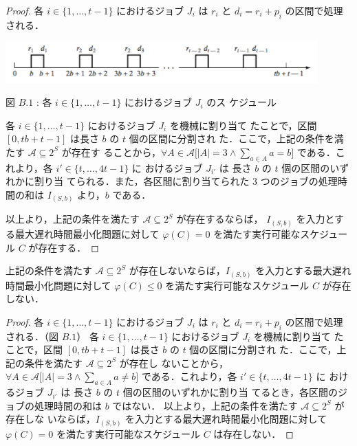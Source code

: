 \documentclass[12pt]{optlab-bachelor}
\begin{document}
\begin{proof}
  各 $i \in \{1,\ldots,t - 1\}$ におけるジョブ $J_i$ は $r_i$ と $d_i =
  r_i + p_i$ の区間で処理される．
  \begin{center}
    \includegraphics[width = 12cm]{Lmax1.png}

    図 $B.1$ : 各 $i \in \{1,\ldots,t - 1\}$ におけるジョブ $J_i$ のス
    ケジュール
  \end{center}
  各 $i \in \{1,\ldots,t - 1\}$ におけるジョブ $J_i$ を機械に割り当て
  たことで，区間 $[0,tb + t - 1]$ は長さ $b$ の $t$ 個の区間に分割され
  た．ここで，上記の条件を満たす $\mathcal{A} \subseteq 2^S$ が存在す
  ることから，$\forall A \in \mathcal{A}\big[|A| = 3 \land \sum_{a \in
  A}a = b \big]$ である．これより，各 $i' \in \{t,\ldots,4t - 1\}$ に
  おけるジョブ $J_{i'}$ は 長さ $b$ の $t$ 個の区間のいずれかに割り当
  てられる．また，各区間に割り当てられた 3 つのジョブの処理時間の和は
  $I_{(S,b)}$ より，$b$ である．

  以上より，上記の条件を満たす $\mathcal{A} \subseteq 2^S$ が存在するならば，
  $I_{(S,b)}$ を入力とする最大遅れ時間最小化問題に対して $\varphi(C) =
  0$ を満たす実行可能なスケジュール $C$ が存在する．
\end{proof}

\begin{lemma}\label{l_4}
  上記の条件を満たす $\mathcal{A} \subseteq 2^S$ が存在しないならば，$I_{(S,b)}$ を入力とする最大遅れ時間最小化問題に対して $\varphi(C) \le
  0$ を満たす実行可能なスケジュール $C$ が存在しない．
\end{lemma}

\begin{proof}
  各 $i \in \{1,\ldots,t - 1\}$ におけるジョブ $J_i$ は $r_i$ と $d_i =
  r_i + p_i$ の区間で処理される．（図 $B.1$）
  各 $i \in \{1,\ldots,t - 1\}$ におけるジョブ $J_i$ を機械に割り当て
  たことで，区間 $[0,tb + t - 1]$ は長さ $b$ の $t$ 個の区間に分割され
  た．ここで，上記の条件を満たす $\mathcal{A} \subseteq 2^S$ が存在し
  ないことから，$\forall A \in \mathcal{A}\big[|A| = 3 \land \sum_{a \in
  A}a \neq b \big]$ である．これより，各 $i' \in \{t,\ldots,4t - 1\}$ に
  おけるジョブ $J_{i'}$ は 長さ $b$ の $t$ 個の区間のいずれかに割り当
  てるとき，各区間のジョブの処理時間の和は $b$ ではない．
  以上より，上記の条件を満たす $\mathcal{A} \subseteq 2^S$ が存在しな
  いならば，$I_{(S,b)}$ を入力とする最大遅れ時間最小化問題に対して
  $\varphi(C) = 0$ を満たす実行可能なスケジュール $C$ は存在しない．
\end{proof}
\end{document}
